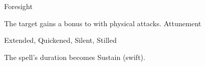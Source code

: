 \begin{spellsection}{Foresight}
\begin{spellheader}
\end{spellheader}
\begin{spellcontent}
\begin{spelltargetinginfo}
\end{spelltargetinginfo}
\begin{spelleffects}
\spelleffect
The target gains a  bonus to  with physical attacks.
\spelldur Attunement
\end{spelleffects}
\end{spellcontent}
\begin{spellfooter}
 Extended, Quickened, Silent, Stilled
\end{spellfooter}
\begin{spellsubcontent}
\begin{spellcantrip}
The spell's duration becomes Sustain (swift).
\end{spellcantrip}
\end{spellsubcontent}
\end{spellsection}
